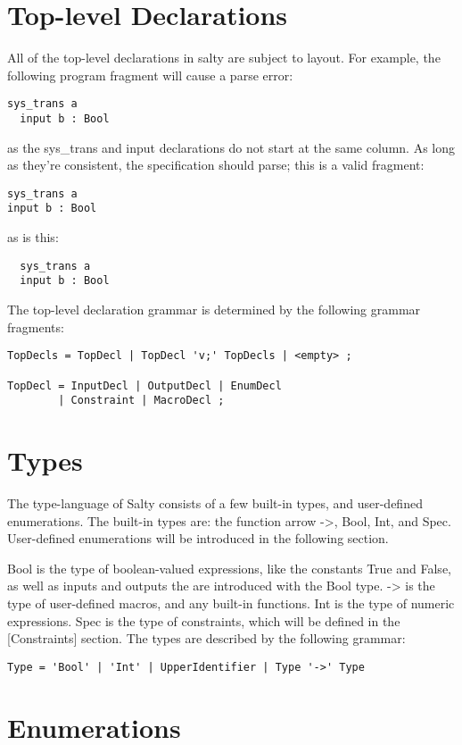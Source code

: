 \section{Top-level Declarations}

All of the top-level declarations in salty are subject to layout. For example, the following program fragment will cause a parse error:
\begin{lstlisting}
sys_trans a
  input b : Bool
\end{lstlisting}
\noindent as the sys\_trans and input declarations do not start at the same column. As long as they're consistent, the specification should parse; this is a valid fragment:
\begin{lstlisting}
sys_trans a
input b : Bool
\end{lstlisting}
\noindent as is this:
\begin{lstlisting}
  sys_trans a
  input b : Bool
\end{lstlisting}
\noindent The top-level declaration grammar is determined by the following grammar fragments:
\begin{lstlisting}
TopDecls = TopDecl | TopDecl 'v;' TopDecls | <empty> ;

TopDecl = InputDecl | OutputDecl | EnumDecl
        | Constraint | MacroDecl ;
\end{lstlisting}

\section{Types}

The type-language of Salty consists of a few built-in types, and user-defined enumerations. The built-in types are: the function arrow ->, Bool, Int, and Spec. User-defined enumerations will be introduced in the following section.

Bool is the type of boolean-valued expressions, like the constants True and False, as well as inputs and outputs the are introduced with the Bool type.
-> is the type of user-defined macros, and any built-in functions.
Int is the type of numeric expressions.
Spec is the type of constraints, which will be defined in the [Constraints] section.
The types are described by the following grammar:

\begin{lstlisting}
Type = 'Bool' | 'Int' | UpperIdentifier | Type '->' Type
\end{lstlisting}

\section{Enumerations}

